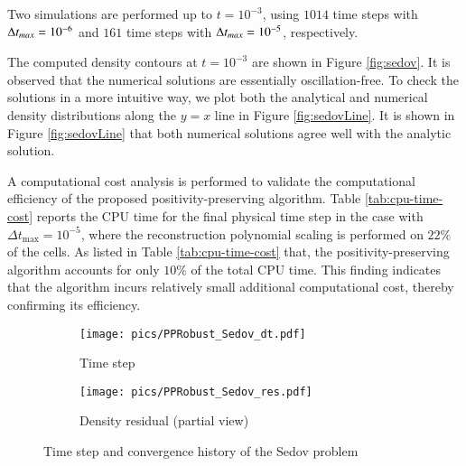 Two simulations are performed up to $t=10^{-3}$,
using $1014$ time steps with $\mathrm\Delta t_{max} = 10^{-6}$
and  $161$ time steps with $\mathrm\Delta t_{max} = 10^{-5}$, respectively. 

The computed density contours at $t=10^{-3}$ are shown in Figure \ref{fig:sedov}. It is observed that the numerical solutions are essentially oscillation-free. To check the solutions in a more intuitive way, we plot both the analytical and numerical density distributions along the $y=x$ line in Figure \ref{fig:sedovLine}.
It is shown in Figure \ref{fig:sedovLine} that both numerical solutions agree well with the analytic solution.

A computational cost analysis is performed to validate the computational efficiency of the proposed positivity-preserving algorithm. Table \ref{tab:cpu-time-cost} reports the CPU time for the final physical time step in the case with $\Delta t_{\text{max}} = 10^{-5}$, where the reconstruction polynomial scaling is performed on $22\%$ of the cells. As listed in Table \ref{tab:cpu-time-cost} that, the positivity-preserving algorithm accounts for only $10\%$ of the total CPU time.
This finding indicates that the algorithm incurs relatively small additional computational cost, thereby confirming its efficiency.

\begin{figure}[htbp]
    \centering
    \begin{subfigure}{0.4\textwidth}
        \texttt{[image: pics/PPRobust\_Sedov\_dt.pdf]}
        \caption[]{Time step}
        \label{sfig:sedov1_dt}
    \end{subfigure}
    \begin{subfigure}{0.4\textwidth}
        \texttt{[image: pics/PPRobust\_Sedov\_res.pdf]}
        \caption[]{Density residual (partial view)}
        \label{sfig:sedov1_res}
    \end{subfigure}
    \caption{Time step and convergence history of the Sedov problem}
    \label{fig:sedov1}
\end{figure}

